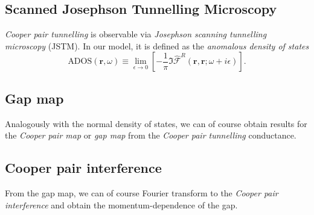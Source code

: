 \subsection{Scanned Josephson Tunnelling Microscopy}
\textit{Cooper pair tunnelling} is observable via \textit{Josephson scanning tunnelling microscopy} (JSTM). In our model, it is defined as the \textit{anomalous density of states}
\begin{equation}
\text{ADOS}\left({\mathbf r}, \omega\right)
\equiv
 \lim_{\epsilon\rightarrow0}\left[
 -\frac{1}{\pi}\Im
\hat{\mathcal{F}}^R\left(\mathbf{r}, \mathbf{r}; \omega+i\epsilon \right)
\right].
\end{equation}

\subsection{Gap map}
Analogously with the normal density of states, we can of course obtain results for the \textit{Cooper pair map} or \textit{gap map} from the \textit{Cooper pair tunnelling} conductance.

\subsection{Cooper pair interference}
From the gap map, we can of course Fourier transform to the \textit{Cooper pair interference} and obtain the momentum-dependence of the gap. 

